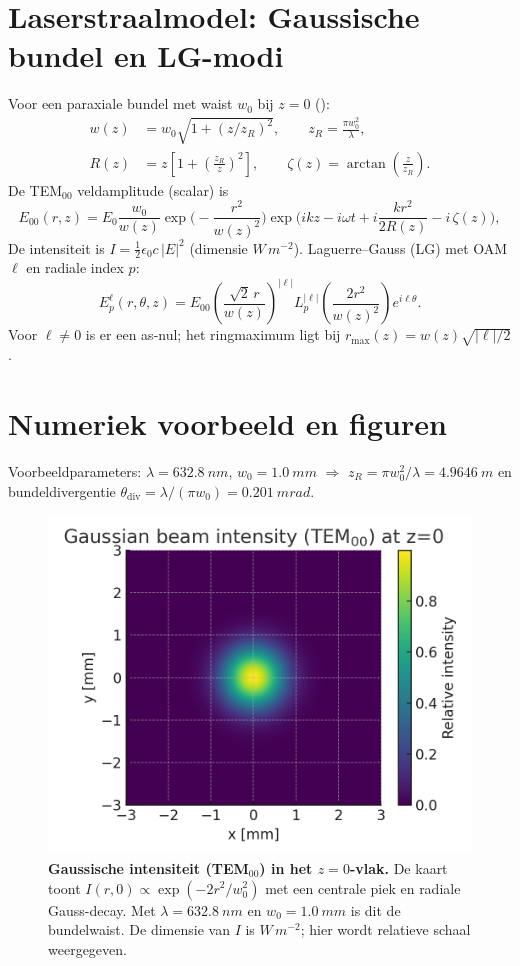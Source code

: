 \documentclass[aps,prb,preprint,amsmath,amssymb]{revtex4-2} %
\begin{document}
    \section{Laserstraalmodel: Gaussische bundel en LG-modi}
    Voor een paraxiale bundel met waist $w_0$ bij $z=0$ (\cite{Siegman1986}):
    \begin{align}
        w(z) &= w_0\sqrt{1+(z/z_R)^2},\qquad z_R=\frac{\pi w_0^2}{\lambda},\\
        R(z) &= z\!\left[1+\left(\frac{z_R}{z}\right)^2\right],\qquad
        \zeta(z)=\arctan\!\left(\frac{z}{z_R}\right).
    \end{align}
    De TEM$_{00}$ veldamplitude (scalar) is
    \[
        E_{00}(r,z)=E_0\frac{w_0}{w(z)}\exp\!\Big(-\frac{r^2}{w(z)^2}\Big)
        \exp\!\Big(i kz - i\omega t + i\frac{k r^2}{2R(z)} - i\,\zeta(z)\Big),
    \]
    De intensiteit is $I=\tfrac12\epsilon_0 c\,|E|^2$ (dimensie $\si{W\,m^{-2}}$).
    Laguerre–Gauss (LG) met OAM $\ell$ en radiale index $p$:
    \[
        E_{p}^{\ell}(r,\theta,z)=E_{00}\!\left(\frac{\sqrt{2}\,r}{w(z)}\right)^{|\ell|}
        L_p^{|\ell|}\!\!\left(\frac{2r^2}{w(z)^2}\right)e^{i\ell\theta}.
    \]
    Voor $\ell\neq 0$ is er een as-nul; het ringmaximum ligt bij
    $r_{\max}(z)=w(z)\sqrt{|\ell|/2}$.

    \section{Numeriek voorbeeld en figuren}
    Voorbeeldparameters: \(\lambda=\SI{632.8}{nm}\), \(w_0=\SI{1.0}{mm}\) $\Rightarrow$
    \(z_R=\pi w_0^2/\lambda=\SI{4.9646}{m}\) en
    bundeldivergentie \(\theta_{\mathrm{div}}=\lambda/(\pi w_0)=\SI{0.201}{mrad}\).

    \begin{figure}[h!]
        \centering
        \includegraphics[width=0.78\linewidth]{gaussian_beam_intensity.png}
        \caption{\textbf{Gaussische intensiteit (TEM$_{00}$) in het $z{=}0$-vlak.}
        De kaart toont $I(r,0)\propto \exp(-2r^2/w_0^2)$ met een centrale piek en
        radiale Gauss-decay. Met $\lambda=\SI{632.8}{nm}$ en $w_0=\SI{1.0}{mm}$ is dit
        de bundelwaist. De dimensie van $I$ is $\si{W\,m^{-2}}$; hier wordt relatieve schaal weergegeven.}
        \label{fig:gauss}
    \end{figure}
\end{document}
